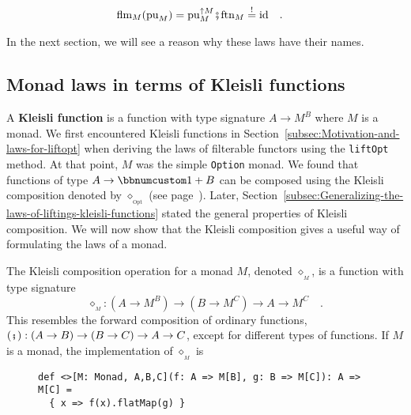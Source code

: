 ~\vspace{-0.6\baselineskip}
\begin{align}
 & \text{flm}_{M}(\text{pu}_{M})=\text{pu}_{M}^{\uparrow M}\bef\text{ftn}_{M}\overset{!}{=}\text{id}\quad.\label{eq:right-identity-law-for-flatten}
\end{align}
\vspace{-0.1\baselineskip}

In the next section, we will see a reason why these laws have their
names.

\subsection{Monad laws in terms of Kleisli functions}

A \textbf{Kleisli function} is a
function with type signature $A\rightarrow M^{B}$ where $M$ is a
monad. We first encountered Kleisli functions in Section~\ref{subsec:Motivation-and-laws-for-liftopt}
when deriving the laws of filterable functors using the \lstinline!liftOpt!
method. At that point, $M$ was the simple \lstinline!Option! monad.
We found that functions of type $A\rightarrow\bbnum 1+B$ can be composed
using the Kleisli composition denoted by $\diamond_{_{\text{Opt}}}$
(see page~\pageref{kleisli-composition}). Later, Section~\ref{subsec:Generalizing-the-laws-of-liftings-kleisli-functions}
stated the general properties of Kleisli composition. We will now
show that the Kleisli composition gives a useful way of formulating
the laws of a monad.

The Kleisli composition operation for a monad $M$, denoted $\diamond_{_{M}}$,
is a function with type signature
\[
\diamond_{_{M}}:(A\rightarrow M^{B})\rightarrow(B\rightarrow M^{C})\rightarrow A\rightarrow M^{C}\quad.
\]
This resembles the forward composition of ordinary functions, $\left(\bef\right):\left(A\rightarrow B\right)\rightarrow\left(B\rightarrow C\right)\rightarrow A\rightarrow C$,
except for different types of functions. If $M$ is a monad, the implementation
of $\diamond_{_{M}}$ is

\begin{wrapfigure}{l}{0.64\columnwidth}%
\vspace{-0.8\baselineskip}
\begin{lstlisting}
def <>[M: Monad, A,B,C](f: A => M[B], g: B => M[C]): A => M[C] =
  { x => f(x).flatMap(g) }
\end{lstlisting}
\vspace{-0.9\baselineskip}
\end{wrapfigure}%

